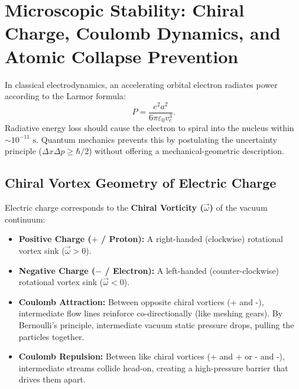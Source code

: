 \section{Microscopic Stability: Chiral Charge, Coulomb Dynamics, and Atomic Collapse Prevention}
\label{sec:mikroskopik_kararlilik}

In classical electrodynamics, an accelerating orbital electron radiates power according to the Larmor formula:
\begin{equation}
    P = \frac{e^2 a^2}{6\pi \varepsilon_0 v_c^3}.
    \label{eq:larmor_klasik}
\end{equation}
Radiative energy loss should cause the electron to spiral into the nucleus within $\sim 10^{-11}\text{ s}$. Quantum mechanics prevents this by postulating the uncertainty principle ($\Delta x \Delta p \ge \hbar/2$) without offering a mechanical-geometric description.

\subsection{Chiral Vortex Geometry of Electric Charge}
Electric charge corresponds to the \textbf{Chiral Vorticity ($\vec{\omega}$)} of the vacuum continuum:
\begin{itemize}
    \item \textbf{Positive Charge ($+$ / Proton):} A right-handed (clockwise) rotational vortex sink ($\vec{\omega} > 0$).
    \item \textbf{Negative Charge ($-$ / Electron):} A left-handed (counter-clockwise) rotational vortex sink ($\vec{\omega} < 0$).
    \item \textbf{Coulomb Attraction:} Between opposite chiral vortices (+ and -), intermediate flow lines reinforce co-directionally (like meshing gears). By Bernoulli's principle, intermediate vacuum static pressure drops, pulling the particles together.
    \item \textbf{Coulomb Repulsion:} Between like chiral vortices (+ and + or - and -), intermediate streams collide head-on, creating a high-pressure barrier that drives them apart.
\end{itemize}

